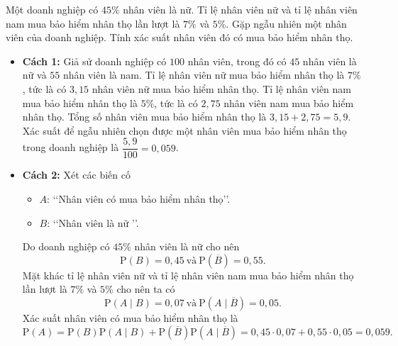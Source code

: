 \begin{bt}%
	Một doanh nghiệp có $45 \%$ nhân viên là nữ. Tỉ lệ nhân viên nữ và tỉ lệ nhân viên nam mua bảo hiểm nhân thọ lần lượt là $7 \%$ và $5 \%$. Gặp ngẫu nhiên một nhân viên của doanh nghiệp. Tính xác suất nhân viên đó có mua bảo hiểm nhân thọ.

	\loigiai{
	}
		\begin{itemize}
			\item \textbf{Cách 1:} Giả sử doanh nghiệp có $100$ nhân viên, trong đó có $45$ nhân viên là nữ và $55$ nhân viên là nam. Tỉ lệ nhân viên nữ mua bảo hiểm nhân thọ là $7 \%$, tức là có $3{,}15$ nhân viên nữ mua bảo hiểm nhân thọ. Tỉ lệ nhân viên nam mua bảo hiểm nhân thọ là $5 \%$, tức là có $2{,}75$ nhân viên nam mua bảo hiểm nhân thọ. Tổng số nhân viên mua bảo hiểm nhân thọ là $3{,}15+2{,}75=5{,}9$.\\
			Xác suất để ngẫu nhiên chọn được một nhân viên mua bảo hiểm nhân thọ trong doanh nghiệp là $\dfrac{5{,}9}{100}=0{,}059$.
			\item \textbf{Cách 2:} Xét các biến cố
			\begin{itemize}
				\item $A$: \lq\lq Nhân viên có mua bảo hiểm nhân thọ\rq\rq.
				\item $B$: \lq\lq Nhân viên là nữ \rq\rq.
			\end{itemize}
			Do doanh nghiệp có $45\%$ nhân viên là nữ cho nên \[\mathrm{P}(B)=0{,}45 ~\text{và}~ \mathrm{P}(\overline{B})=0{,}55.\]
			Mặt khác tỉ lệ nhân viên nữ và tỉ lệ nhân viên nam mua bảo hiểm nhân thọ lần lượt là $7 \%$ và $5 \%$ cho nên ta có \[\mathrm{P}(A\mid B)=0{,}07~ \text{và}~ \mathrm{P}(A\mid \overline{B})=0{,}05.\]
			Xác suất nhân viên có mua bảo hiểm nhân thọ là 
			\[ \mathrm{P}(A)=\mathrm{P}(B)\mathrm{P}(A\mid B)+\mathrm{P}(\overline{B})\mathrm{P}(A\mid \overline{B})=0{,}45\cdot 0{,}07
			+ 0{,}55\cdot 0{,}05 = 0{,}059.\]
		\end{itemize}

\end{bt}

